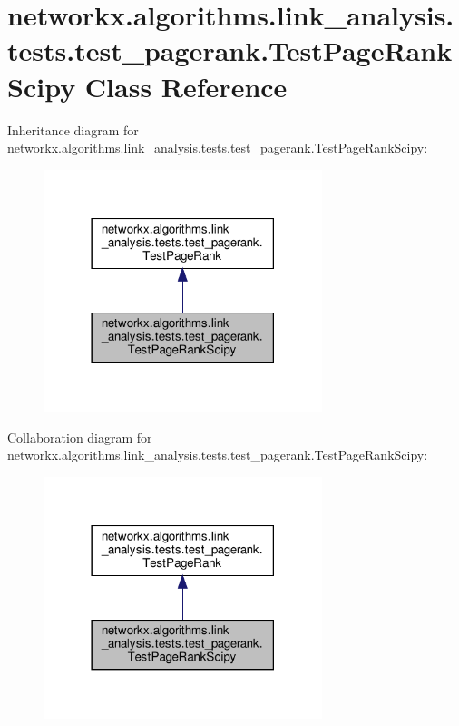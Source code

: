 \hypertarget{classnetworkx_1_1algorithms_1_1link__analysis_1_1tests_1_1test__pagerank_1_1TestPageRankScipy}{}\section{networkx.\+algorithms.\+link\+\_\+analysis.\+tests.\+test\+\_\+pagerank.\+Test\+Page\+Rank\+Scipy Class Reference}
\label{classnetworkx_1_1algorithms_1_1link__analysis_1_1tests_1_1test__pagerank_1_1TestPageRankScipy}


Inheritance diagram for networkx.\+algorithms.\+link\+\_\+analysis.\+tests.\+test\+\_\+pagerank.\+Test\+Page\+Rank\+Scipy\+:
\nopagebreak
\begin{figure}[H]
\begin{center}
\leavevmode
\includegraphics[width=230pt]{classnetworkx_1_1algorithms_1_1link__analysis_1_1tests_1_1test__pagerank_1_1TestPageRankScipy__inherit__graph}
\end{center}
\end{figure}


Collaboration diagram for networkx.\+algorithms.\+link\+\_\+analysis.\+tests.\+test\+\_\+pagerank.\+Test\+Page\+Rank\+Scipy\+:
\nopagebreak
\begin{figure}[H]
\begin{center}
\leavevmode
\includegraphics[width=230pt]{classnetworkx_1_1algorithms_1_1link__analysis_1_1tests_1_1test__pagerank_1_1TestPageRankScipy__coll__graph}
\end{center}
\end{figure}
